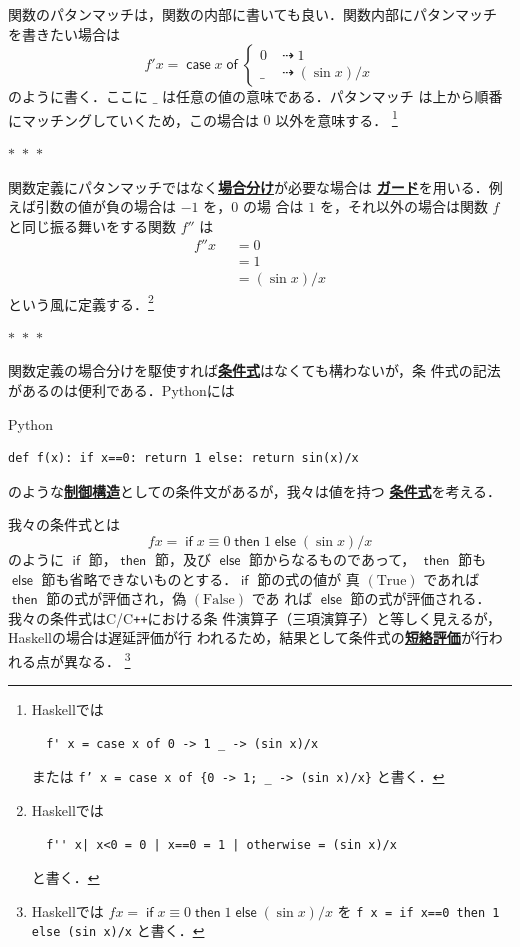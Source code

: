 \documentclass[a5paper,twoside,fleqn]{jsbook}
\newcommand{\separator}{\begin{center}$*$~$*$~$*$\end{center}}
\newcommand{\programminglanguage}[1]{\textsf{#1}}
\newcommand{\clang}{\programminglanguage{C}}
\newcommand{\cxx}{\programminglanguage{C}\texttt{++}}
\newcommand{\haskell}{\programminglanguage{Haskell}}
\newcommand{\python}{\programminglanguage{Python}}
\newcommand{\keyword}[1]{{\underline{\textbf{#1}}}}
\newcommand{\code}[1]{\texttt{#1}}
\newenvironment{pythoncode}{\begin{itembox}[r]{\python}}{\end{itembox}}
\newcommand{\mKeyword}[1]{\mathsf{#1}} %
\newcommand{\mIfKeyword}{\mKeyword{if}}
\newcommand{\mCaseKeyword}{\mKeyword{case}}
\newcommand{\mElseKeyword}{\mKeyword{else}}
\newcommand{\mOfKeyword}{\mKeyword{of}}
\newcommand{\mOtherwiseKeyword}{\mKeyword{otherwise}}
\newcommand{\mThenKeyword}{\mKeyword{then}}
\DeclareMathOperator{\mCaseKW}{\mCaseKeyword} %
\DeclareMathOperator{\mElse}{\mElseKeyword}
\DeclareMathOperator{\mIf}{\mIfKeyword}
\DeclareMathOperator{\mOfKW}{\mOfKeyword} %
\DeclareMathOperator{\mOtherwise}{\mOtherwiseKeyword}
\DeclareMathOperator{\mThen}{\mThenKeyword}
\newcommand{\mSpecialConstant}[1]{\textrm{#1}} %
\newcommand{\mFalse}{\mSpecialConstant{False}}
\newcommand{\mTrue}{\mSpecialConstant{True}}
\newcommand{\mAnyParam}{\_}
\DeclareMathOperator{\mIfSo}{\dashrightarrow}
\newcommand{\mGuard}[1]{\mathop{\mid_{#1}}}
\newcommand{\mCaseOf}[1]{\mCaseKW#1\mOfKW}
\newcommand{\mIfThenElse}[3]{\mIf{#1}\mThen{#2}\mElse{#3}}
\begin{document}
関数のパタンマッチは，関数の内部に書いても良い．関数内部にパタンマッチ
を書きたい場合は
\begin{equation}
f'x=\mCaseOf{x}\left\{
\begin{aligned}
0&\mIfSo1\\ \mAnyParam&\mIfSo(\sin x)/x
\end{aligned}
\right.
\end{equation}
のように書く．ここに $\mAnyParam$ は任意の値の意味である．パタンマッチ
は上から順番にマッチングしていくため，この場合は $0$ 以外を意味する．
\footnote{\haskell では
\begin{verbatim}
  f' x = case x of 0 -> 1 _ -> (sin x)/x
\end{verbatim}
または \code{f' x = case x of \{0 -> 1; \_ -> (sin x)/x\}} と書く．}

\separator

関数定義にパタンマッチではなく\keyword{場合分け}が必要な場合は
\keyword{ガード}を用いる．例えば引数の値が負の場合は $-1$ を，$0$ の場
合は $1$ を，それ以外の場合は関数 $f$ と同じ振る舞いをする関数 $f''$ は
\begin{equation}
\begin{aligned}
f''x&\mGuard{x<0}=0\\ &\mGuard{x\equiv
  0}=1\\ &\mGuard{\mOtherwise}=(\sin x)/x
\end{aligned}
\end{equation}
という風に定義する．\footnote{\haskell では
\begin{verbatim}
  f'' x| x<0 = 0 | x==0 = 1 | otherwise = (sin x)/x
\end{verbatim}
と書く．}



\separator

関数定義の場合分けを駆使すれば\keyword{条件式}はなくても構わないが，条
件式の記法があるのは便利である．\python には
\begin{pythoncode}
\begin{verbatim}
def f(x): if x==0: return 1 else: return sin(x)/x
\end{verbatim}
\end{pythoncode}
のような\keyword{制御構造}としての条件文があるが，我々は値を持つ
\keyword{条件式}を考える．

我々の条件式とは
\begin{equation}
fx=\mIfThenElse{x\equiv0}{1}{{}(\sin x)/x}
\end{equation}
のように $\mIf$ 節，$\mThen$ 節，及び $\mElse$ 節からなるものであって，
$\mThen$ 節も $\mElse$ 節も省略できないものとする．$\mIf$ 節の式の値が
真 $(\mTrue)$ であれば $\mThen$ 節の式が評価され，偽 $(\mFalse)$ であ
れば $\mElse$ 節の式が評価される．我々の条件式は\clang/\cxx における条
件演算子（三項演算子）と等しく見えるが，\haskell の場合は遅延評価が行
われるため，結果として条件式の\keyword{短絡評価}が行われる点が異なる．
\footnote{\haskell では $fx=\mIfThenElse{x\equiv0}{1}{{}(\sin x)/x}$
  を \code{f x = if x==0 then 1 else (sin x)/x} と書く．}
\end{document}
